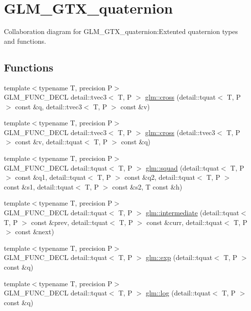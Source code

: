 \hypertarget{group__gtx__quaternion}{
\section{GLM\_\-GTX\_\-quaternion}
\label{group__gtx__quaternion}
}


Collaboration diagram for GLM\_\-GTX\_\-quaternion:Extented quaternion types and functions.  
\subsection*{Functions}
\begin{CompactItemize}
\item 
{\footnotesize template$<$typename T, precision P$>$ }\\GLM\_\-FUNC\_\-DECL detail::tvec3$<$ T, P $>$ \hyperlink{group__gtx__quaternion_g968a8e63b616c369286b541a3ac96484}{glm::cross} (detail::tquat$<$ T, P $>$ const \&q, detail::tvec3$<$ T, P $>$ const \&v)
\item 
{\footnotesize template$<$typename T, precision P$>$ }\\GLM\_\-FUNC\_\-DECL detail::tvec3$<$ T, P $>$ \hyperlink{group__gtx__quaternion_gd81a2ea5c1048d8101ce2876eb6569f7}{glm::cross} (detail::tvec3$<$ T, P $>$ const \&v, detail::tquat$<$ T, P $>$ const \&q)
\item 
{\footnotesize template$<$typename T, precision P$>$ }\\GLM\_\-FUNC\_\-DECL detail::tquat$<$ T, P $>$ \hyperlink{group__gtx__quaternion_g8ed8845077927e9b8fc7bd74872c161a}{glm::squad} (detail::tquat$<$ T, P $>$ const \&q1, detail::tquat$<$ T, P $>$ const \&q2, detail::tquat$<$ T, P $>$ const \&s1, detail::tquat$<$ T, P $>$ const \&s2, T const \&h)
\item 
{\footnotesize template$<$typename T, precision P$>$ }\\GLM\_\-FUNC\_\-DECL detail::tquat$<$ T, P $>$ \hyperlink{group__gtx__quaternion_ge94a070898e8be560a5dcf8e15854b2d}{glm::intermediate} (detail::tquat$<$ T, P $>$ const \&prev, detail::tquat$<$ T, P $>$ const \&curr, detail::tquat$<$ T, P $>$ const \&next)
\item 
{\footnotesize template$<$typename T, precision P$>$ }\\GLM\_\-FUNC\_\-DECL detail::tquat$<$ T, P $>$ \hyperlink{group__gtx__quaternion_gd4ec8f59911f01bb4c298839017ba91f}{glm::exp} (detail::tquat$<$ T, P $>$ const \&q)
\item 
{\footnotesize template$<$typename T, precision P$>$ }\\GLM\_\-FUNC\_\-DECL detail::tquat$<$ T, P $>$ \hyperlink{group__gtx__quaternion_gbed81c73a777fce84fe442bbc17c13ce}{glm::log} (detail::tquat$<$ T, P $>$ const \&q)

\end{CompactItemize}

